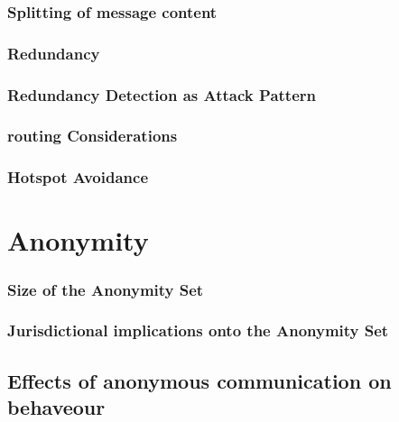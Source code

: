 \subsection{Splitting of message content}

\subsection{Redundancy}

\subsection{Redundancy Detection as Attack Pattern}

\subsection{routing Considerations}

\subsection{Hotspot Avoidance}


\chapter{Anonymity}

\subsection{Size of the Anonymity Set}

\subsection{Jurisdictional implications onto the Anonymity Set}

\section{Effects of anonymous communication on behaveour}


